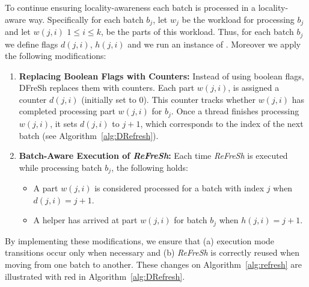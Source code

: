 To continue ensuring locality-awareness each batch is processed in a locality-aware way. 
Specifically for each batch $b_j$, let $w_j$ be the workload for processing $b_j$ 
and let $w(j,i)$ $1 \leq i \leq k$, be the parts of this workload.
Thus, for each batch $b_j$ we define flags $d(j,i)$, $h(j,i)$ and we run an instance
of \Refresh. Moreover we apply the following modifications:

\begin{enumerate}  
    \item \textbf{Replacing Boolean Flags with Counters:}  
    Instead of using boolean flags, DFreSh replaces them with counters. Each part $w(j,i)$,
    is assigned a counter $d(j,i)$ (initially set to 0). This counter tracks whether $w(j,i)$ has
    completed processing part $w(j,i)$ for $b_j$. Once a thread finishes processing $w(j,i)$, it
    sets $d(j,i)$ to $\mathit{j} + 1$, which corresponds to the index of the next
    batch (see Algorithm~\ref{alg:DRefresh}).  

    \item \textbf{Batch-Aware Execution of \textit{ReFreSh}:}  
    Each time \textit{ReFreSh} is executed while processing batch $b_j$, the following holds:
    \begin{itemize}  
        \item A part $w(j,i)$ is considered processed for a batch with index $j$ when $d(j,i) = j + 1$.  
        \item A helper has arrived at part $w(j,i)$ for batch $b_j$ when $h(j,i) = j + 1$.  
    \end{itemize}  
\end{enumerate}  
% 
By implementing these modifications, we ensure that (a) execution mode transitions 
occur only when necessary and (b) \textit{ReFreSh} is correctly reused when moving 
from one batch to another.
These changes on Algorithm~\ref{alg:refresh} are illustrated with red in Algorithm~\ref{alg:DRefresh}.


